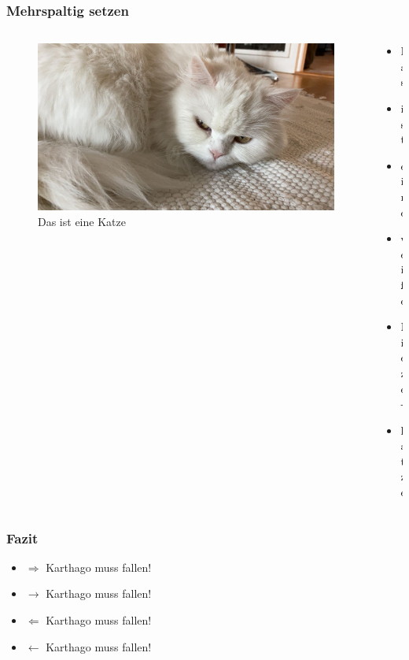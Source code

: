 \documentclass[ngerman]{beamer}
\begin{document}
\begin{frame}
\frametitle{Mehrspaltig setzen}

\begin{columns}

\begin{column}{0.7\textwidth}
\begin{figure}
	\centering
	\includegraphics[width=\textwidth]{./Bilder/miau.jpg}
	\caption{Das ist eine Katze}\label{fig:mieze}
\end{figure}
\end{column}

\begin{column}{0.29\textwidth}
\begin{itemize}
	\item Das
	\item ist 
	\item eine
	\item weiße
	\item Mieze-
	\item katze
	\end{itemize}
\end{column}

\end{columns}


\end{frame}


\begin{frame}
	\frametitle{Fazit}
	
\begin{itemize}
	\item $\Rightarrow$ Karthago muss fallen! \pause
	\item $\rightarrow$ Karthago muss fallen!	\pause
	\item $\Leftarrow$ Karthago muss fallen! \pause
	\item $\leftarrow$ Karthago muss fallen!	
\end{itemize}	

\end{frame}
\end{document}

